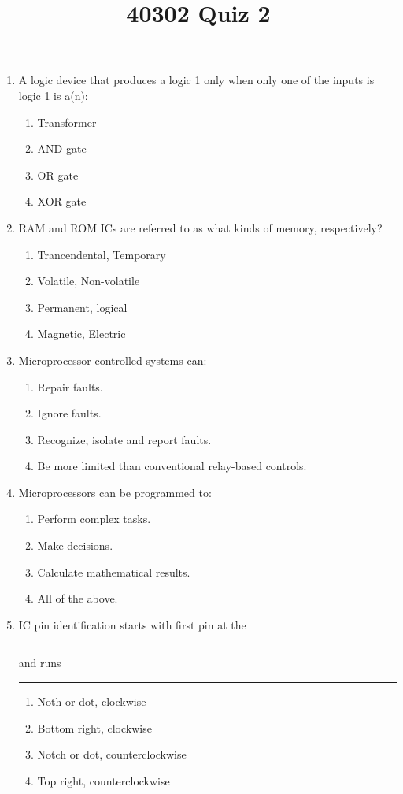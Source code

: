\documentclass[10pt]{article}
\title{40302 Quiz 2}
\begin{document}
\begin{multicols}{2}
\begin{enumerate}
\item A logic device that produces a logic 1 only when only one of the inputs is logic 1 is a(n):
	\begin{enumerate}
	\item Transformer
	\item AND gate
	\item OR gate
	\item XOR gate
	\end{enumerate}
\item RAM and ROM ICs are referred to as what kinds of memory, respectively?
	\begin{enumerate}
	\item Trancendental, Temporary
	\item Volatile, Non-volatile
	\item Permanent, logical
	\item Magnetic, Electric
	\end{enumerate}
\item Microprocessor controlled systems can:
	\begin{enumerate}
	\item Repair faults.
	\item Ignore faults.
	\item Recognize, isolate and report faults.
	\item Be more limited than conventional relay-based controls.
	\end{enumerate}
\item Microprocessors can be programmed to:
	\begin{enumerate}
	\item Perform complex tasks.
	\item Make decisions.
	\item Calculate mathematical results.
	\item All of the above.
	\end{enumerate}
\item IC pin identification starts with first pin at the \rule{1cm}{0.15mm} and runs \rule{1cm}{0.15cm}
	\begin{enumerate}
	\item Noth or dot, clockwise
	\item Bottom right, clockwise
	\item Notch or dot, counterclockwise
	\item Top right, counterclockwise
	\end{enumerate}

\end{enumerate}
\end{multicols}
\end{document}
